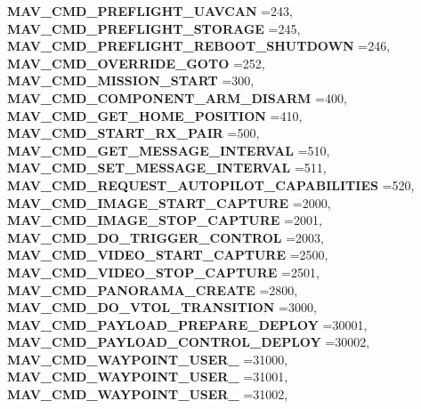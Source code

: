 \begin{DoxyCompactItemize}
\textbf{ M\+A\+V\+\_\+\+C\+M\+D\+\_\+\+P\+R\+E\+F\+L\+I\+G\+H\+T\+\_\+\+U\+A\+V\+C\+AN} =243, 
\textbf{ M\+A\+V\+\_\+\+C\+M\+D\+\_\+\+P\+R\+E\+F\+L\+I\+G\+H\+T\+\_\+\+S\+T\+O\+R\+A\+GE} =245, 
\textbf{ M\+A\+V\+\_\+\+C\+M\+D\+\_\+\+P\+R\+E\+F\+L\+I\+G\+H\+T\+\_\+\+R\+E\+B\+O\+O\+T\+\_\+\+S\+H\+U\+T\+D\+O\+WN} =246, 
\newline
\textbf{ M\+A\+V\+\_\+\+C\+M\+D\+\_\+\+O\+V\+E\+R\+R\+I\+D\+E\+\_\+\+G\+O\+TO} =252, 
\textbf{ M\+A\+V\+\_\+\+C\+M\+D\+\_\+\+M\+I\+S\+S\+I\+O\+N\+\_\+\+S\+T\+A\+RT} =300, 
\textbf{ M\+A\+V\+\_\+\+C\+M\+D\+\_\+\+C\+O\+M\+P\+O\+N\+E\+N\+T\+\_\+\+A\+R\+M\+\_\+\+D\+I\+S\+A\+RM} =400, 
\textbf{ M\+A\+V\+\_\+\+C\+M\+D\+\_\+\+G\+E\+T\+\_\+\+H\+O\+M\+E\+\_\+\+P\+O\+S\+I\+T\+I\+ON} =410, 
\newline
\textbf{ M\+A\+V\+\_\+\+C\+M\+D\+\_\+\+S\+T\+A\+R\+T\+\_\+\+R\+X\+\_\+\+P\+A\+IR} =500, 
\textbf{ M\+A\+V\+\_\+\+C\+M\+D\+\_\+\+G\+E\+T\+\_\+\+M\+E\+S\+S\+A\+G\+E\+\_\+\+I\+N\+T\+E\+R\+V\+AL} =510, 
\textbf{ M\+A\+V\+\_\+\+C\+M\+D\+\_\+\+S\+E\+T\+\_\+\+M\+E\+S\+S\+A\+G\+E\+\_\+\+I\+N\+T\+E\+R\+V\+AL} =511, 
\textbf{ M\+A\+V\+\_\+\+C\+M\+D\+\_\+\+R\+E\+Q\+U\+E\+S\+T\+\_\+\+A\+U\+T\+O\+P\+I\+L\+O\+T\+\_\+\+C\+A\+P\+A\+B\+I\+L\+I\+T\+I\+ES} =520, 
\newline
\textbf{ M\+A\+V\+\_\+\+C\+M\+D\+\_\+\+I\+M\+A\+G\+E\+\_\+\+S\+T\+A\+R\+T\+\_\+\+C\+A\+P\+T\+U\+RE} =2000, 
\textbf{ M\+A\+V\+\_\+\+C\+M\+D\+\_\+\+I\+M\+A\+G\+E\+\_\+\+S\+T\+O\+P\+\_\+\+C\+A\+P\+T\+U\+RE} =2001, 
\textbf{ M\+A\+V\+\_\+\+C\+M\+D\+\_\+\+D\+O\+\_\+\+T\+R\+I\+G\+G\+E\+R\+\_\+\+C\+O\+N\+T\+R\+OL} =2003, 
\textbf{ M\+A\+V\+\_\+\+C\+M\+D\+\_\+\+V\+I\+D\+E\+O\+\_\+\+S\+T\+A\+R\+T\+\_\+\+C\+A\+P\+T\+U\+RE} =2500, 
\newline
\textbf{ M\+A\+V\+\_\+\+C\+M\+D\+\_\+\+V\+I\+D\+E\+O\+\_\+\+S\+T\+O\+P\+\_\+\+C\+A\+P\+T\+U\+RE} =2501, 
\textbf{ M\+A\+V\+\_\+\+C\+M\+D\+\_\+\+P\+A\+N\+O\+R\+A\+M\+A\+\_\+\+C\+R\+E\+A\+TE} =2800, 
\textbf{ M\+A\+V\+\_\+\+C\+M\+D\+\_\+\+D\+O\+\_\+\+V\+T\+O\+L\+\_\+\+T\+R\+A\+N\+S\+I\+T\+I\+ON} =3000, 
\textbf{ M\+A\+V\+\_\+\+C\+M\+D\+\_\+\+P\+A\+Y\+L\+O\+A\+D\+\_\+\+P\+R\+E\+P\+A\+R\+E\+\_\+\+D\+E\+P\+L\+OY} =30001, 
\newline
\textbf{ M\+A\+V\+\_\+\+C\+M\+D\+\_\+\+P\+A\+Y\+L\+O\+A\+D\+\_\+\+C\+O\+N\+T\+R\+O\+L\+\_\+\+D\+E\+P\+L\+OY} =30002, 
\textbf{ M\+A\+V\+\_\+\+C\+M\+D\+\_\+\+W\+A\+Y\+P\+O\+I\+N\+T\+\_\+\+U\+S\+E\+R\+\_} =31000, 
\textbf{ M\+A\+V\+\_\+\+C\+M\+D\+\_\+\+W\+A\+Y\+P\+O\+I\+N\+T\+\_\+\+U\+S\+E\+R\+\_} =31001, 
\textbf{ M\+A\+V\+\_\+\+C\+M\+D\+\_\+\+W\+A\+Y\+P\+O\+I\+N\+T\+\_\+\+U\+S\+E\+R\+\_} =31002, 

\end{DoxyCompactItemize}
